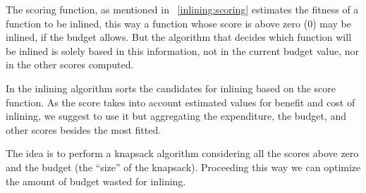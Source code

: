 
The scoring function, as mentioned in ~\ref{inlining:scoring} estimates the
fitness of a function to be inlined, this way a function whose score is above
zero ($0$) may be inlined, if the budget allows. But the algorithm that decides
which function will be inlined is solely based in this information, not in the
current budget value, nor in the other scores computed.

In \cite{BerubePhD} the inlining algorithm sorts the candidates for inlining
based on the score function. As the score takes into account estimated values for
benefit and cost of inlining, we suggest to use it but aggregating the expenditure,
the budget, and other scores besides the most fitted.

The idea is to perform a knapsack algorithm considering all the scores above zero
and the budget (the ``size'' of the knapsack). Proceeding this way we can optimize
the amount of budget wasted for inlining.


